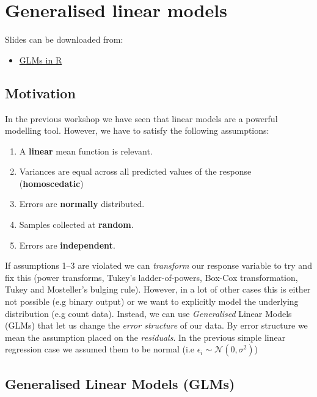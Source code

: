 \documentclass[]{book}
\providecommand{\tightlist}{%
  \setlength{\itemsep}{0pt}\setlength{\parskip}{0pt}}
\theoremstyle{definition}
\theoremstyle{definition}
\theoremstyle{definition}
\theoremstyle{remark}
\begin{document}
\chapter{Generalised linear models}\label{generalised-linear-models}

Slides can be downloaded from:

\begin{itemize}
\tightlist
\item
  \href{https://exeter-data-analytics.github.io/StatModelling/03-generalised-linear-models-handout.pdf}{GLMs
  in R}
\end{itemize}

\section{Motivation}\label{motivation-1}

In the previous workshop we have seen that linear models are a powerful
modelling tool. However, we have to satisfy the following assumptions:

\begin{enumerate}
\def\labelenumi{\arabic{enumi}.}
\tightlist
\item
  A \textbf{linear} mean function is relevant.
\item
  Variances are equal across all predicted values of the response
  (\textbf{homoscedatic})
\item
  Errors are \textbf{normally} distributed.
\item
  Samples collected at \textbf{random}.
\item
  Errors are \textbf{independent}.
\end{enumerate}

If assumptions 1--3 are violated we can \emph{transform} our response
variable to try and fix this (power transforms, Tukey's
ladder-of-powers, Box-Cox transformation, Tukey and Mosteller's bulging
rule). However, in a lot of other cases this is either not possible (e.g
binary output) or we want to explicitly model the underlying
distribution (e.g count data). Instead, we can use \emph{Generalised}
Linear Models (GLMs) that let us change the \emph{error structure} of
our data. By error structure we mean the assumption placed on the
\emph{residuals}. In the previous simple linear regression case we
assumed them to be normal (i.e
\(\epsilon_i \sim \mathcal{N}(0,\sigma^2)\))

\section{Generalised Linear Models
(GLMs)}\label{generalised-linear-models-glms}
\end{document}
